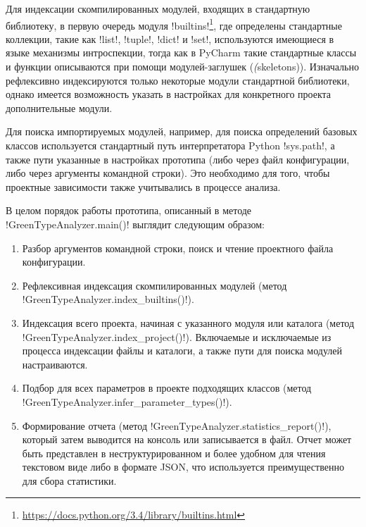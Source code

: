 Для индексации скомпилированных модулей, входящих в стандартную библиотеку, в
первую очередь модуля
!builtins!\footnote{\url{https://docs.python.org/3.4/library/builtins.html}},
где определены стандартные коллекции, такие как !list!, !tuple!, !dict! и !set!,
используются имеющиеся в языке механизмы интроспекции, тогда как в PyCharm
такие стандартные классы и функции описываются при помощи модулей-заглушек
(\emph(skeletons)).
Изначально рефлексивно индексируются только некоторые модули стандартной
библиотеки, однако имеется возможность указать в настройках для конкретного
проекта дополнительные модули.

Для поиска импортируемых модулей, например, для поиска определений базовых
классов используется стандартный путь интерпретатора Python !sys.path!, а также пути
указанные в настройках прототипа (либо через файл конфигурации, либо через
аргументы командной строки). Это необходимо для того, чтобы проектные
зависимости также учитывались в процессе анализа.

В целом порядок работы прототипа, описанный в методе !GreenTypeAnalyzer.main()! 
выглядит следующим образом:

\begin{enumerate}
    \item Разбор аргументов командной строки, поиск и чтение проектного файла
      конфигурации.

    \item Рефлексивная индексация скомпилированных модулей (метод
      !GreenTypeAnalyzer.index_builtins()!).

    \item Индексация всего проекта, начиная с указанного модуля или каталога 
      (метод !GreenTypeAnalyzer.index_project()!).
      Включаемые и исключаемые из процесса индексации файлы и каталоги, а также
      пути для поиска модулей настраиваются. 

    \item Подбор для всех параметров в проекте подходящих классов (метод
      !GreenTypeAnalyzer.infer_parameter_types()!).

    \item Формирование отчета (метод !GreenTypeAnalyzer.statistics_report()!),
      который затем выводится на консоль или записывается в файл. Отчет может
      быть представлен в неструктурированном и более удобном для чтения
      текстовом виде либо в формате JSON, что используется преимущественно для
      сбора статистики. 

\end{enumerate}

